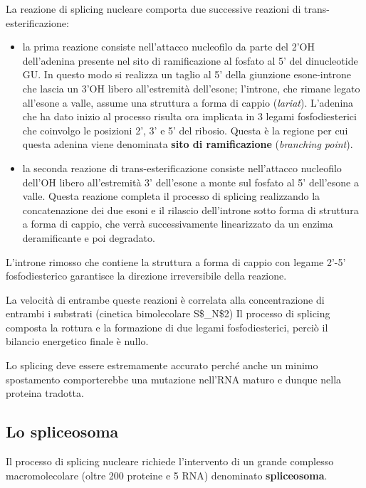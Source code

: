 \documentclass[11pt]{book}
\begin{document}
La reazione di splicing nucleare comporta due successive reazioni di
trans-esterificazione:

\begin{itemize}
\itemsep1pt\parskip0pt
\item
  la prima reazione consiste nell'attacco nucleofilo da parte del 2'OH
  dell'adenina presente nel sito di ramificazione al fosfato al 5' del
  dinucleotide GU. In questo modo si realizza un taglio al 5' della
  giunzione esone-introne che lascia un 3'OH libero all'estremità
  dell'esone; l'introne, che rimane legato all'esone a valle, assume una
  struttura a forma di cappio (\emph{lariat}). L'adenina che ha dato
  inizio al processo risulta ora implicata in 3 legami fosfodiesterici
  che coinvolgo le posizioni 2', 3' e 5' del ribosio. Questa è la
  regione per cui questa adenina viene denominata \textbf{sito di
  ramificazione} (\emph{branching point}).
\item
  la seconda reazione di trans-esterificazione consiste nell'attacco
  nucleofilo dell'OH libero all'estremità 3' dell'esone a monte sul
  fosfato al 5' dell'esone a valle. Questa reazione completa il processo
  di splicing realizzando la concatenazione dei due esoni e il rilascio
  dell'introne sotto forma di struttura a forma di cappio, che verrà
  successivamente linearizzato da un enzima deramificante e poi
  degradato.
\end{itemize}

L'introne rimosso che contiene la struttura a forma di cappio con legame
2'-5' fosfodiesterico garantisce la direzione irreversibile della
reazione.

La velocità di entrambe queste reazioni è correlata alla concentrazione
di entrambi i substrati (cinetica bimolecolare S\$\_N\$2) Il processo di
splicing composta la rottura e la formazione di due legami
fosfodiesterici, perciò il bilancio energetico finale è nullo.

Lo splicing deve essere estremamente accurato perché anche un minimo
spostamento comporterebbe una mutazione nell'RNA maturo e dunque nella
proteina tradotta.

\subsection{Lo spliceosoma}\label{lo-spliceosoma}

Il processo di splicing nucleare richiede l'intervento di un grande
complesso macromolecolare (oltre 200 proteine e 5 RNA) denominato
\textbf{spliceosoma}.
\end{document}
